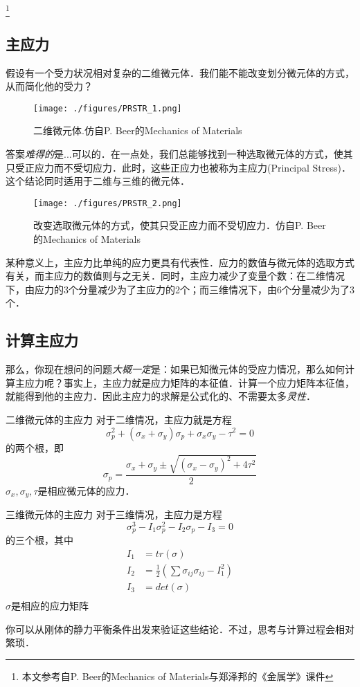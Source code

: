 
\footnote{本文参考自P. Beer的Mechanics of Materials与郑泽邦的《金属学》课件}

\subsection{主应力}
假设有一个受力状况相对复杂的二维微元体．我们能不能改变划分微元体的方式，从而简化他的受力？
\begin{figure}[ht]
\centering
\texttt{[image: ./figures/PRSTR\_1.png]}
\caption{二维微元体.仿自P. Beer的Mechanics of Materials} \label{PRSTR_fig1}
\end{figure}

答案\textsl{难得的}是...可以的．在一点处，我们总能够找到一种选取微元体的方式，使其只受正应力而不受切应力．此时，这些正应力也被称为主应力(Principal Stress)．这个结论同时适用于二维与三维的微元体．
\begin{figure}[ht]
\centering
\texttt{[image: ./figures/PRSTR\_2.png]}
\caption{改变选取微元体的方式，使其只受正应力而不受切应力．仿自P. Beer的Mechanics of Materials} \label{PRSTR_fig2}
\end{figure}

某种意义上，主应力比单纯的应力更具有代表性．应力的数值与微元体的选取方式有关，而主应力的数值则与之无关．同时，主应力减少了变量个数：在二维情况下，由应力的3个分量减少为了主应力的2个；而三维情况下，由6个分量减少为了3个．

\subsection{计算主应力}

那么，你现在想问的问题\textsl{大概一定}是：如果已知微元体的受应力情况，那么如何计算主应力呢？事实上，主应力就是应力矩阵的本征值．计算一个应力矩阵本征值，就能得到他的主应力．因此主应力的求解是公式化的、不需要太多\textsl{灵性}．

\begin{example}{二维微元体的主应力}
对于二维情况，主应力就是方程
$$\sigma_p^2+(\sigma_x+\sigma_y)\sigma_p+\sigma_x\sigma_y-\tau^2=0$$
的两个根，即
$$\sigma_p=\frac{\sigma_x+\sigma_y \pm \sqrt{(\sigma_x-\sigma_y)^2+4\tau^2}}{2}$$
$\sigma_x,\sigma_y,\tau$是相应微元体的应力．
\end{example}

\begin{example}{三维微元体的主应力}
对于三维情况，主应力是方程 
$$
\sigma_p^3-I_1\sigma_p^2-I_2\sigma_p-I_3=0
$$
的三个根，其中
$$
\begin{aligned}
I_1&=tr(\sigma)\\
I_2&=\frac{1}{2} ({\sum \sigma_{ij} \sigma_{ij} -I_1^2})\\
I_3&=det(\sigma)\\
\end{aligned}
$$
$\sigma$是相应的应力矩阵
\end{example}
你可以从刚体的静力平衡条件出发来验证这些结论．不过，思考与计算过程会相对繁琐．
